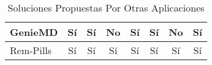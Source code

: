 \begin{table}[H]
{\begin{tabular}{|l|c|c|c|c|c|c|c|}
		GenieMD                          & Sí              & Sí                                                                         & No                                                                            & Sí                                                                      & Sí                                                           & No                                                                    & Sí                                                                 \\ \hline
		Rem-Pills                          & Sí              & Sí                                                                         & Sí                                                                            & Sí                                                                      & Sí                                                           & Sí                                                                    & Sí                                                                 \\ \hline
	\end{tabular}
	}
\caption{Soluciones Propuestas Por Otras Aplicaciones}
\label{SolucionesProp}
\end{table}

